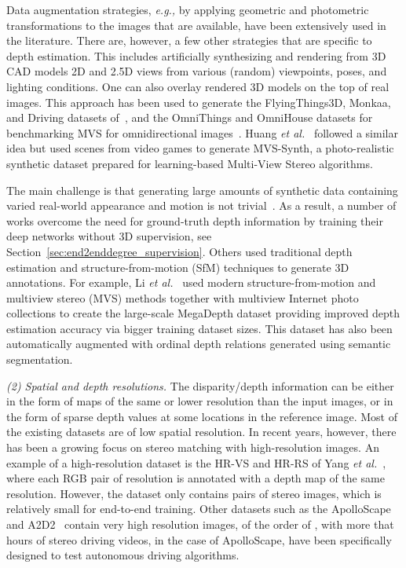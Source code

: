 \documentclass[10pt,journal,compsoc]{IEEEtran}
\newcommand{\eg}{\emph{e.g., }}
\newcommand{\etal}{\emph{et al.}}
\newcommand{\noi}{\noindent}
\begin{document}
Data augmentation strategies, \eg by applying  geometric and photometric transformations to the images that are available,  have been extensively used in the literature.  There are, however, a few other strategies that  are specific to depth estimation. This includes artificially  synthesizing and rendering  from  3D CAD models 2D and 2.5D views from various (random) viewpoints, poses, and lighting conditions. One can also overlay  rendered 3D models on the  top of real images. This approach has been used to generate the FlyingThings3D, Monkaa, and Driving datasets of~\cite{mayer2016large}, and the OmniThings and OmniHouse datasets for benchmarking MVS for omnidirectional images~\cite{Won_2019_ICCV,Won_2020_PAMI}. Huang \etal~\cite{huang2018deepmvs} followed a similar idea but used scenes from video games to generate MVS-Synth, a photo-realistic synthetic dataset prepared for learning-based Multi-View Stereo algorithms.  

The main challenge  is that generating large amounts of synthetic data containing varied real-world appearance and motion is not trivial~\cite{mayer2018makes}.  As a result, a number of works overcome the need for ground-truth depth information by training their deep networks without 3D supervision, see Section~\ref{sec:end2enddegree_supervision}.  Others used traditional depth estimation and structure-from-motion (SfM) techniques to generate 3D annotations. For example, Li \etal~\cite{Li_2018_CVPR} used modern structure-from-motion and multiview stereo (MVS) methods together with multiview Internet photo collections to create the large-scale MegaDepth dataset providing improved depth estimation accuracy via bigger training dataset sizes. This dataset has  also been automatically augmented with ordinal depth relations generated using semantic segmentation.





\vspace{6pt}
\noi\textit{(2) Spatial and depth resolutions. } The disparity/depth information can be either in the form of maps of the same or lower resolution than the input images, or in the form of sparse depth values at some locations in the reference image. Most of the existing datasets are of low spatial resolution. In recent years, however, there has been a growing focus on stereo matching with high-resolution images. An example of a high-resolution dataset is the HR-VS and HR-RS of Yang \etal~\cite{Yang_2019_CVPR}, where each RGB pair of resolution  is annotated with a depth map of the same resolution. However, the dataset  only contains  pairs of stereo images, which is relatively small for end-to-end training. Other datasets such as  the  ApolloScape~\cite{wang2019apolloscape} and   A2D2~\cite{geyer2020a2d2} contain very high resolution images, of the order of , with more that  hours of stereo driving videos, in the case of ApolloScape, have been specifically designed to test autonomous driving algorithms.
\end{document}
